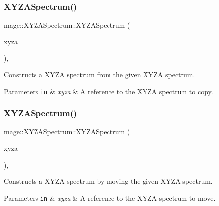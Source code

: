 \subsubsection{\texorpdfstring{X\+Y\+Z\+A\+Spectrum()}{XYZASpectrum()}\hspace{0.1cm}{\footnotesize\ttfamily [3/10]}}
{\footnotesize\ttfamily mage\+::\+X\+Y\+Z\+A\+Spectrum\+::\+X\+Y\+Z\+A\+Spectrum (\begin{DoxyParamCaption}\item[{const \hyperlink{structmage_1_1_x_y_z_a_spectrum}{X\+Y\+Z\+A\+Spectrum} \&}]{xyza }\end{DoxyParamCaption})\hspace{0.3cm}{\ttfamily [default]}, {\ttfamily [noexcept]}}

Constructs a X\+Y\+ZA spectrum from the given X\+Y\+ZA spectrum.


\begin{DoxyParams}[1]{Parameters}
\mbox{\tt in}  & {\em xyza} & A reference to the X\+Y\+ZA spectrum to copy. \\
\hline
\end{DoxyParams}
\hypertarget{structmage_1_1_x_y_z_a_spectrum_a08e4635f76feced3cabc8a8c7289f036}{}\label{structmage_1_1_x_y_z_a_spectrum_a08e4635f76feced3cabc8a8c7289f036} 
\subsubsection{\texorpdfstring{X\+Y\+Z\+A\+Spectrum()}{XYZASpectrum()}\hspace{0.1cm}{\footnotesize\ttfamily [4/10]}}
{\footnotesize\ttfamily mage\+::\+X\+Y\+Z\+A\+Spectrum\+::\+X\+Y\+Z\+A\+Spectrum (\begin{DoxyParamCaption}\item[{\hyperlink{structmage_1_1_x_y_z_a_spectrum}{X\+Y\+Z\+A\+Spectrum} \&\&}]{xyza }\end{DoxyParamCaption})\hspace{0.3cm}{\ttfamily [default]}, {\ttfamily [noexcept]}}

Constructs a X\+Y\+ZA spectrum by moving the given X\+Y\+ZA spectrum.


\begin{DoxyParams}[1]{Parameters}
\mbox{\tt in}  & {\em xyza} & A reference to the X\+Y\+ZA spectrum to move. \\
\hline
\end{DoxyParams}
\hypertarget{structmage_1_1_x_y_z_a_spectrum_a386891a5434a510ea532cd023c26124a}{}\label{structmage_1_1_x_y_z_a_spectrum_a386891a5434a510ea532cd023c26124a} 
